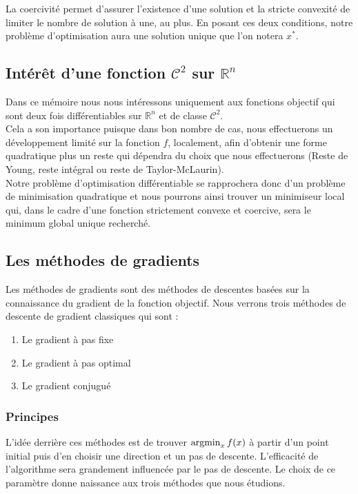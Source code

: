 La coercivité permet d'assurer l'existence d'une solution et la stricte convexité de limiter le nombre de solution à une, au plus. En posant ces deux conditions, notre problème d'optimisation aura une solution unique que l'on notera $x^*$.

\subsection{Intérêt d'une fonction $\mathcal{C}^2$ sur $\mathbb{R}^n$}
Dans ce mémoire nous nous intéressons uniquement aux fonctions objectif qui sont deux fois différentiables sur $\mathbb{R}^n$ et de classe $\mathcal{C}^2$. \\

Cela a son importance puisque dans bon nombre de cas, nous effectuerons un développement limité sur la fonction $f$, localement, afin d'obtenir une forme quadratique plus un reste qui dépendra du choix que nous effectuerons (Reste de Young, reste intégral ou reste de Taylor-McLaurin). \\

Notre problème d'optimisation différentiable se rapprochera donc d'un problème de minimisation quadratique et nous pourrons ainsi trouver un minimiseur local qui, dans le cadre d'une fonction strictement convexe et coercive, sera le minimum global unique recherché.
\subsection{Les méthodes de gradients}
Les méthodes de gradients sont des méthodes de descentes basées sur la connaissance du gradient de la fonction objectif. Nous verrons trois méthodes de descente de gradient classiques qui sont :
\begin{enumerate}
	\item Le gradient à pas fixe
	\item Le gradient à pas optimal
	\item Le gradient conjugué
\end{enumerate}
\subsubsection{Principes}
L'idée derrière ces méthodes est de trouver $\argmin_x f(x)$ à partir d'un point initial puis d'en choisir une direction et un pas de descente. L'efficacité de l'algorithme sera grandement influencée par le pas de descente. Le choix de ce paramètre donne naissance aux trois méthodes que nous étudions.
